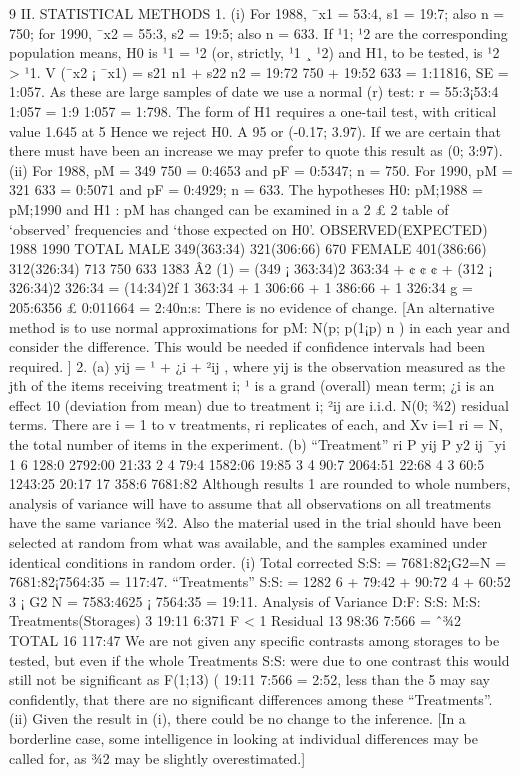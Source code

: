 9
II. STATISTICAL METHODS
1. (i) For 1988, ¯x1 = 53:4, s1 = 19:7; also n = 750;
for 1990, ¯x2 = 55:3, s2 = 19:5; also n = 633.
If ¹1; ¹2 are the corresponding population means, H0 is ¹1 = ¹2 (or, strictly,
¹1 ¸ ¹2) and H1, to be tested, is ¹2 > ¹1.
V (¯x2 ¡ ¯x1) = s21
n1
+ s22
n2
= 19:72
750 + 19:52
633 = 1:11816, SE = 1:057.
As these are large samples of date we use a normal (r) test:
r = 55:3¡53:4
1:057 = 1:9
1:057 = 1:798.
The form of H1 requires a one-tail test, with critical value 1.645 at 5%
Hence we reject H0.
A 95%
or (-0.17; 3.97).
If we are certain that there must have been an increase we may prefer to
quote this result as (0; 3:97).
(ii) For 1988, pM = 349
750 = 0:4653 and pF = 0:5347; n = 750.
For 1990, pM = 321
633 = 0:5071 and pF = 0:4929; n = 633.
The hypotheses H0: pM;1988 = pM;1990 and H1 : pM has changed can be
examined in a 2 £ 2 table of ‘observed’ frequencies and ‘those expected on
H0’.
OBSERVED(EXPECTED) 1988 1990 TOTAL
MALE 349(363:34) 321(306:66) 670
FEMALE 401(386:66) 312(326:34) 713
750 633 1383
Â2
(1) =
(349 ¡ 363:34)2
363:34
+ ¢ ¢ ¢ +
(312 ¡ 326:34)2
326:34
= (14:34)2f
1
363:34
+
1
306:66
+
1
386:66
+
1
326:34
g
= 205:6356 £ 0:011664 = 2:40n:s:
There is no evidence of change.
[An alternative method is to use normal approximations for pM: N(p; p(1¡p)
n )
in each year and consider the difference. This would be needed if confidence
intervals had been required. ]
2. (a) yij = ¹ + ¿i + ²ij , where yij is the observation measured as the jth of the
items receiving treatment i; ¹ is a grand (overall) mean term; ¿i is an effect
10
(deviation from mean) due to treatment i; ²ij are i.i.d. N(0; ¾2) residual
terms. There are i = 1 to v treatments, ri replicates of each, and
Xv
i=1
ri = N,
the total number of items in the experiment.
(b)
“Treatment” ri
P
yij
P
y2
ij ¯yi
1 6 128:0 2792:00 21:33
2 4 79:4 1582:06 19:85
3 4 90:7 2064:51 22:68
4 3 60:5 1243:25 20:17
17 358:6 7681:82
Although results 1 are rounded to whole numbers, analysis of variance will
have to assume that all observations on all treatments have the same variance
¾2. Also the material used in the trial should have been selected at
random from what was available, and the samples examined under identical
conditions in random order.
(i) Total corrected S:S: = 7681:82¡G2=N = 7681:82¡7564:35 = 117:47. “Treatments”
S:S: =
1282
6
+
79:42 + 90:72
4
+
60:52
3
¡
G2
N
= 7583:4625 ¡ 7564:35 = 19:11.
Analysis of Variance D:F: S:S: M:S:
Treatments(Storages) 3 19:11 6:371 F < 1
Residual 13 98:36 7:566 = ˆ¾2
TOTAL 16 117:47
We are not given any specific contrasts among storages to be tested, but
even if the whole Treatments S:S: were due to one contrast this would still
not be significant as F(1;13) ( 19:11
7:566 = 2:52, less than the 5%
may say confidently, that there are no significant differences among these
“Treatments”.
(ii) Given the result in (i), there could be no change to the inference. [In a
borderline case, some intelligence in looking at individual differences may be
called for, as ¾2 may be slightly overestimated.]
